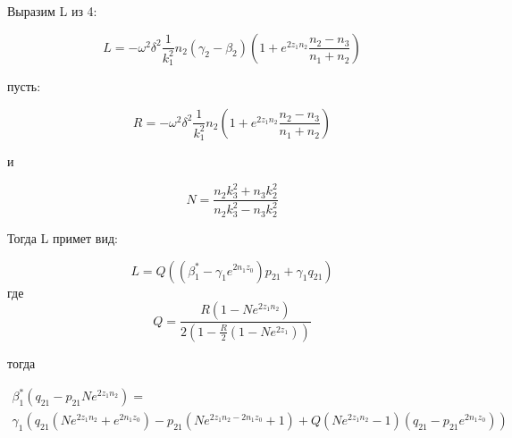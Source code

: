	Выразим L из 4:
	
	\begin{equation}
		L = - \omega^2 \delta^2 \frac{1}{k_1^2} n_2 (\gamma_2 - \beta_2) (1 + e^{2 z_1 n_2 } \frac{n_2 - n_3}{n_1 + n_2})
	\end{equation}
	
	пусть:
	
	$$R = - \omega^2 \delta^2 \frac{1}{k_1^2} n_2 (1 + e^{2 z_1 n_2 } \frac{n_2 - n_3}{n_1 + n_2})$$
	
	и 
	
	$$N =  \frac{n_2 k_3^2 + n_3 k_2^2}{n_2 k_3^2 - n_3 k_2^2} $$
	
	Тогда L примет вид:
	
	$$L = Q ((\beta_1^* - \gamma_1 e^{2n_1 z_0} ) p_{21} + \gamma_1 q_{21}) $$
	где
	$$Q = \frac{R (1 - Ne^{2 z_1 n_2})}{2 (1 - \frac{R}{2}(1 - N e^{2 z_1}))}$$
	
	тогда 
	
	\begin{equation}
		\begin{aligned}
			\beta_1^* (q_{21} - p_{21} N e^{2 z_1 n_2}) = \\
			\gamma_1 (q_{21} 	(Ne^{2z_1 n_2} + e^{2 n_1 z_0}) - p_{21} (N e^{2 z_1 n_2 - 2 n_1 z_0} + 1) +  
			Q(Ne^{2 z_1 n_2} - 1) (q_{21} - p_{21} e^{2 n_1 z_0}) )\\
		\end{aligned}
	\end{equation}
	

	
	
	 
